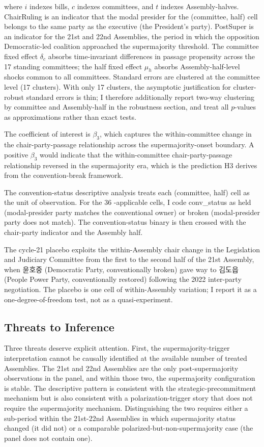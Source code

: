 \documentclass[11pt]{article}
\begin{document}
where $i$ indexes bills, $c$ indexes committees, and $t$ indexes Assembly-halves. ChairRuling is an indicator that the modal presider for the (committee, half) cell belongs to the same party as the executive (the President's party). PostSuper is an indicator for the 21st and 22nd Assemblies, the period in which the opposition Democratic-led coalition approached the supermajority threshold. The committee fixed effect $\delta_c$ absorbs time-invariant differences in passage propensity across the 17 standing committees; the half fixed effect $\mu_h$ absorbs Assembly-half-level shocks common to all committees. Standard errors are clustered at the committee level (17 clusters). With only 17 clusters, the asymptotic justification for cluster-robust standard errors is thin; I therefore additionally report two-way clustering by committee and Assembly-half in the robustness section, and treat all $p$-values as approximations rather than exact tests.

The coefficient of interest is $\beta_3$, which captures the within-committee change in the chair-party-passage relationship across the supermajority-onset boundary. A positive $\beta_3$ would indicate that the within-committee chair-party-passage relationship reversed in the supermajority era, which is the prediction H3 derives from the convention-break framework.

The convention-status descriptive analysis treats each (committee, half) cell as the unit of observation. For the 36 \citet{jung2018}-applicable cells, I code conv\_status as held (modal-presider party matches the conventional owner) or broken (modal-presider party does not match). The convention-status binary is then crossed with the chair-party indicator and the Assembly half.

The cycle-21 placebo exploits the within-Assembly chair change in the Legislation and Judiciary Committee from the first to the second half of the 21st Assembly, when 윤호중 (Democratic Party, conventionally broken) gave way to 김도읍 (People Power Party, conventionally restored) following the 2022 inter-party negotiation. The placebo is one cell of within-Assembly variation; I report it as a one-degree-of-freedom test, not as a quasi-experiment.

\subsection{Threats to Inference}

Three threats deserve explicit attention. First, the supermajority-trigger interpretation cannot be causally identified at the available number of treated Assemblies. The 21st and 22nd Assemblies are the only post-supermajority observations in the panel, and within those two, the supermajority configuration is stable. The descriptive pattern is consistent with the strategic-precommitment mechanism but is also consistent with a polarization-trigger story that does not require the supermajority mechanism. Distinguishing the two requires either a sub-period within the 21st-22nd Assemblies in which supermajority status changed (it did not) or a comparable polarized-but-non-supermajority case (the panel does not contain one).
\end{document}
